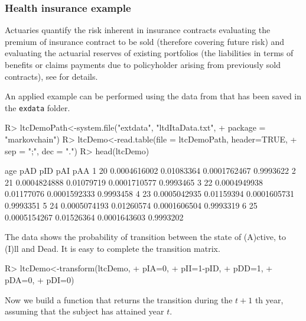 \documentclass[
  nojss]{jss}
\begin{document}
\subsubsection{Health insurance example}\label{sec:hi}

Actuaries quantify the risk inherent in insurance contracts evaluating the premium of insurance contract to be sold (therefore covering future risk) and evaluating the actuarial reserves of existing portfolios (the liabilities in terms of benefits or claims payments due to policyholder arising from previously sold contracts), see \cite{deshmukh2012multiple} for details.

An applied example can be performed using the data from \cite{de2016assicurazioni} that has been saved in the \texttt{exdata} folder.

\begin{CodeChunk}
\begin{CodeInput}
R> ltcDemoPath<-system.file("extdata", "ltdItaData.txt", 
+                          package = "markovchain")
R> ltcDemo<-read.table(file = ltcDemoPath, header=TRUE, 
+                     sep = ";", dec = ".")
R> head(ltcDemo)
\end{CodeInput}
\begin{CodeOutput}
  age          pAD        pID          pAI       pAA
1  20 0.0004616002 0.01083364 0.0001762467 0.9993622
2  21 0.0004824888 0.01079719 0.0001710577 0.9993465
3  22 0.0004949938 0.01177076 0.0001592333 0.9993458
4  23 0.0005042935 0.01159394 0.0001605731 0.9993351
5  24 0.0005074193 0.01260574 0.0001606504 0.9993319
6  25 0.0005154267 0.01526364 0.0001643603 0.9993202
\end{CodeOutput}
\end{CodeChunk}

The data shows the probability of transition between the state of (A)ctive, to (I)ll and Dead. It is easy to complete the
transition matrix.

\begin{CodeChunk}
\begin{CodeInput}
R> ltcDemo<-transform(ltcDemo,
+                    pIA=0,
+                    pII=1-pID,
+                    pDD=1,
+                    pDA=0,
+                    pDI=0)
\end{CodeInput}
\end{CodeChunk}

Now we build a function that returns the transition during the \(t+1\) th year, assuming that the subject has attained year \(t\).
\end{document}
